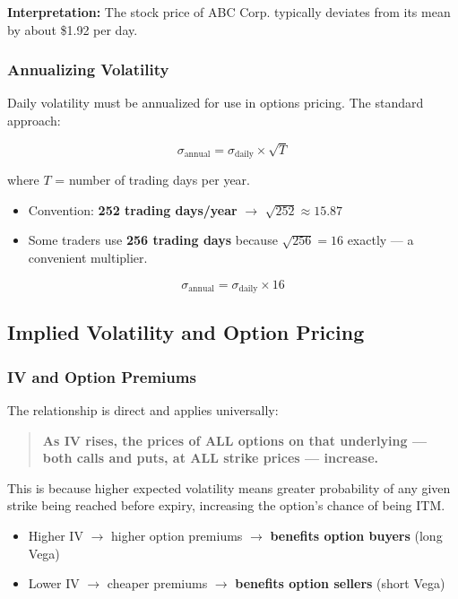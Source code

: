 \documentclass[12pt,openany]{book}
\begin{document}
\textbf{Interpretation:} The stock price of ABC Corp. typically deviates from its mean by about \$1.92 per day.

\subsubsection{Annualizing Volatility}

Daily volatility must be annualized for use in options pricing. The standard approach:

\[
\sigma_{\text{annual}} = \sigma_{\text{daily}} \times \sqrt{T}
\]

where \(T\) = number of trading days per year.

\begin{itemize}[leftmargin=*]
    \item Convention: \textbf{252 trading days/year} \(\rightarrow\) \(\sqrt{252} \approx 15.87\)
    \item Some traders use \textbf{256 trading days} because \(\sqrt{256} = 16\) exactly — a convenient multiplier.
\end{itemize}

\[
\boxed{\sigma_{\text{annual}} = \sigma_{\text{daily}} \times 16}
\]

\subsection{Implied Volatility and Option Pricing}

\subsubsection{IV and Option Premiums}

The relationship is direct and applies universally:

\begin{quote}
\textbf{As IV rises, the prices of ALL options on that underlying — both calls and puts, at ALL strike prices — increase.}
\end{quote}

This is because higher expected volatility means greater probability of any given strike being reached before expiry, increasing the option's chance of being ITM.

\begin{itemize}[leftmargin=*]
    \item Higher IV \(\rightarrow\) higher option premiums \(\rightarrow\) \textbf{benefits option buyers} (long Vega)
    \item Lower IV \(\rightarrow\) cheaper premiums \(\rightarrow\) \textbf{benefits option sellers} (short Vega)
\end{itemize}
\end{document}
